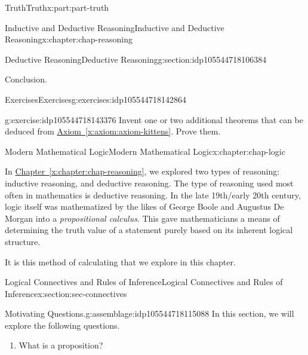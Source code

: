 \documentclass[oneside,10pt,]{book}
\newcommand{\xreffont}{\relax}
\numberwithin{equation}{section}
\begin{document}
\begin{partptx}{Truth}{}{Truth}{}{}{x:part:part-truth}
\begin{chapterptx}{Inductive and Deductive Reasoning}{}{Inductive and Deductive Reasoning}{}{}{x:chapter:chap-reasoning}
\begin{sectionptx}{Deductive Reasoning}{}{Deductive Reasoning}{}{}{g:section:idp105544718106384}
\begin{conclusion}{Conclusion.}
\end{conclusion}%
%
%
\typeout{************************************************}
\typeout{************************************************}
%
\begin{exercises-subsection-numberless}{Exercises}{}{Exercises}{}{}{g:exercises:idp105544718142864}
\begin{divisionexercise}{1}{}{}{g:exercise:idp105544718143376}%
Invent one or two additional theorems that can be deduced from \hyperref[x:axiom:axiom-kittens]{Axiom~{\xreffont\ref{x:axiom:axiom-kittens}}}. Prove them.%
\end{divisionexercise}%
\end{exercises-subsection-numberless}
\end{sectionptx}
\end{chapterptx}
%
\typeout{************************************************}
\typeout{************************************************}
%
\begin{chapterptx}{Modern Mathematical Logic}{}{Modern Mathematical Logic}{}{}{x:chapter:chap-logic}
\begin{introduction}{}%
In \hyperref[x:chapter:chap-reasoning]{Chapter~{\xreffont\ref{x:chapter:chap-reasoning}}}, we explored two types of reasoning: inductive reasoning, and deductive reasoning. The type of reasoning used most often in mathematics is deductive reasoning. In the late 19th\slash{}early 20th century, logic itself was mathematized by the likes of George Boole and Augustus De Morgan into a \emph{propositional calculus}. This gave mathematicians a means of determining the truth value of a statement purely based on its inherent logical structure.%
\par
It is this method of calculating that we explore in this chapter.%
\end{introduction}%
%
%
\typeout{************************************************}
\typeout{************************************************}
%
\begin{sectionptx}{Logical Connectives and Rules of Inference}{}{Logical Connectives and Rules of Inference}{}{}{x:section:sec-connectives}
\begin{assemblage}{Motivating Questions.}{g:assemblage:idp105544718115088}%
In this section, we will explore the following questions. %
\begin{enumerate}
\item{}What is a proposition?%

\end{enumerate}
\end{assemblage}
\end{sectionptx}
\end{chapterptx}
\end{partptx}
\end{document}
